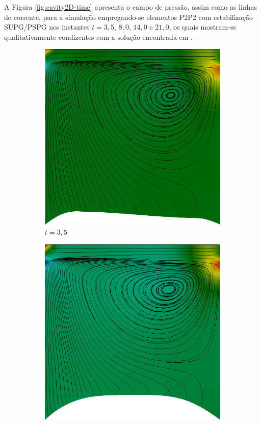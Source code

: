 A Figura \ref{fig:cavity2D-time} apresenta o campo de pressão, assim como as linhas de corrente, para a simulação empregando-se elementos P2P2 com estabilização SUPG/PSPG nos instantes $t=3,5$, $8,0$, $14,0$ e $21,0$, os quais mostram-se qualitativamente condizentes com a solução encontrada em .

\begin{figure}[h!]
    \centering
    \caption{Cavidade com fundo flexível - Distribuição de pressão e linhas de corrente.}
    \begin{subfigure}[b]{0.3\textwidth}
        \includegraphics[width=\linewidth]{Figuras/FSI-Cavity2D/t3_5.png}
        \caption{$t=3,5$}
    \end{subfigure}
    \begin{subfigure}[b]{0.3\textwidth}
        \includegraphics[width=\linewidth]{Figuras/FSI-Cavity2D/t8.png}

\end{subfigure}
\end{figure}
